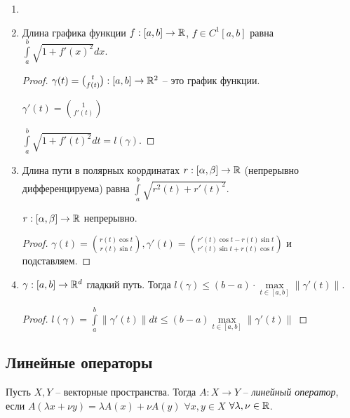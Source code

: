 \begin{corollary}
    \begin{enumerate}
        \item[]
        \item Длина графика функции $f:[a, b]\rightarrow \mathbb{R}$, $f\in C^1[a, b]$ равна $\int\limits_a^b\sqrt{1+f'(x)^2}dx$.

        \begin{proof}
            $\gamma(t)=\binom{t}{f(t)}:[a, b]\rightarrow \mathbb{R}^2$ – это график функции.

            $\gamma'(t)=\binom{1}{f'(t)}$

            $\int\limits_a^b\sqrt{1+f'(t)^2}dt=l(\gamma)$.
        \end{proof}

        \item Длина пути в полярных координатах $r:[\alpha, \beta]\rightarrow \mathbb{R}$ (непрерывно дифференцируема) равна $\int\limits_a^b \sqrt{r^2(t)+r'(t)^2}$.

        $r:[\alpha, \beta]\rightarrow \mathbb{R}$ непрерывно.

        \begin{proof}
            $\gamma(t)=\binom{r(t)\cos t}{r(t)\sin t}, \gamma'(t)=\binom{r'(t)\cos t-r(t)\sin t}{r'(t)\sin t+r(t)\cos t}$ и подставляем.
        \end{proof}

        \item $\gamma:[a, b]\rightarrow \mathbb{R}^d$ гладкий путь. Тогда $l(\gamma)\leq (b-a)\cdot\max\limits_{t\in [a, b]}\|\gamma'(t)\|$.

        \begin{proof}
            $l(\gamma)=\int\limits_a^b\|\gamma'(t)\|dt \leq (b-a)\max\limits_{t\in [a, b]}\|\gamma'(t)\|$
        \end{proof}
    \end{enumerate}
\end{corollary}

\subsection{Линейные операторы}

\begin{definition}
    Пусть $X, Y$ – векторные пространства. Тогда $A:X\rightarrow Y$ – \textit{линейный оператор}, если $A(\lambda x+\nu y)=\lambda A(x)+\nu A(y)$ $\forall x, y\in X$ $\forall \lambda, \nu\in \mathbb{R}$.
\end{definition}


